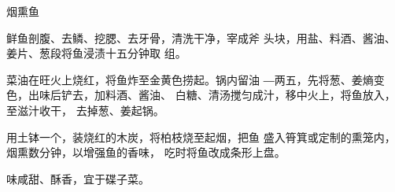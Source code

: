 \begin{recipe}{烟熏鱼}

\ingredients


\cooking

\step 鲜鱼剖腹、去鳞、挖腮、去牙骨，清洗干净，宰成斧 头块，用盐、料酒、酱油、姜片、葱段将鱼浸渍十五分钟取 组。

\step 菜油在旺火上烧红，将鱼炸至金黄色捞起。锅内留油 ―两五，先将葱、姜熵变色，出味后铲去，加料酒、酱油、 白糖、清汤搅匀成汁，移中火上，将鱼放入，至滋汁收干， 去掉葱、姜起锅。

\step 用土钵一个，装烧红的木炭，将柏枝烧至起烟，把鱼 盛入筲箕或定制的熏笼内，烟熏数分钟，以增强鱼的香味， 吃时将鱼改成条形上盘。

\notes

味咸甜、酥香，宜于碟子菜。

\end{recipe}


